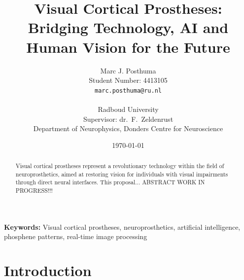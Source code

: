 \documentclass[10pt]{article}
\title{Visual Cortical Prostheses: Bridging Technology, AI and Human Vision for the Future}
\author{
  Marc J. Posthuma\\
  Student Number: 4413105\\
  \texttt{marc.posthuma@ru.nl}\\
  \\
  Radboud University\\
  Supervisor: dr.\ F.\ Zeldenrust\\
  Department of Neurophysics, Donders Centre for Neuroscience
}
\date{\today}
\begin{document}
\pagestyle{plain}%
\listoftodos%
\clearpage%

\newpage%

\maketitle
\thispagestyle{firstpage} %
\begin{abstract}
    \noindent Visual cortical prostheses represent a revolutionary technology
    within the field of neuro\-prosthetics, aimed at restoring vision for
    individuals with visual impairments through direct neural interfaces. This
    proposal... ABSTRACT WORK IN PROGRESS!!!
\end{abstract}
\textbf{Keywords:} Visual cortical prostheses, neuroprosthetics, artificial intelligence, phosphene patterns, real-time image processing
\vspace{1cm}

\thispagestyle{firstpage}
\section*{Introduction}\label{sec:intro}

\pagestyle{rest} %

\printbibliography%
\end{document}

